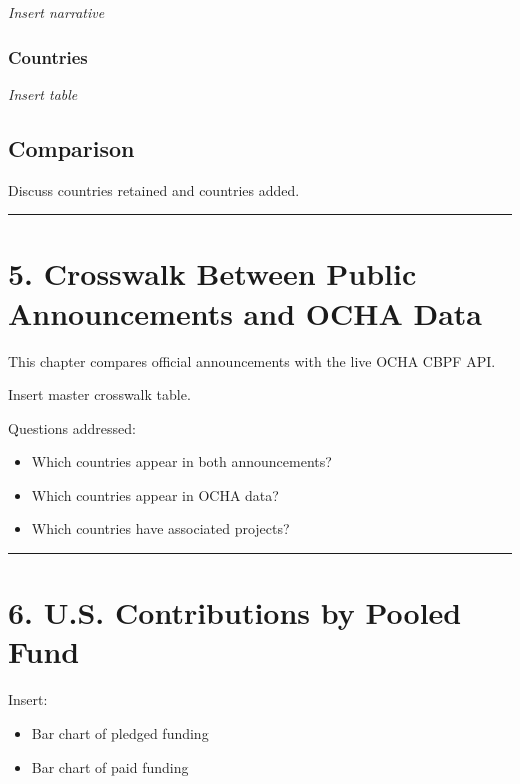 \documentclass[
  11pt,
  letterpaper,
  DIV=11,
  numbers=noendperiod]{scrartcl}
\providecommand{\tightlist}{%
  \setlength{\itemsep}{0pt}\setlength{\parskip}{0pt}}
\begin{document}
\emph{Insert narrative}

\subsubsection{Countries}\label{countries-1}

\emph{Insert table}

\subsection{Comparison}\label{comparison}

Discuss countries retained and countries added.

\begin{center}\rule{0.5\linewidth}{0.5pt}\end{center}

\section{5. Crosswalk Between Public Announcements and OCHA
Data}\label{crosswalk-between-public-announcements-and-ocha-data}

This chapter compares official announcements with the live OCHA CBPF
API.

Insert master crosswalk table.

Questions addressed:

\begin{itemize}
\tightlist
\item
  Which countries appear in both announcements?
\item
  Which countries appear in OCHA data?
\item
  Which countries have associated projects?
\end{itemize}

\begin{center}\rule{0.5\linewidth}{0.5pt}\end{center}

\section{6. U.S. Contributions by Pooled
Fund}\label{u.s.-contributions-by-pooled-fund}

Insert:

\begin{itemize}
\tightlist
\item
  Bar chart of pledged funding
\item
  Bar chart of paid funding
\end{itemize}
\end{document}
